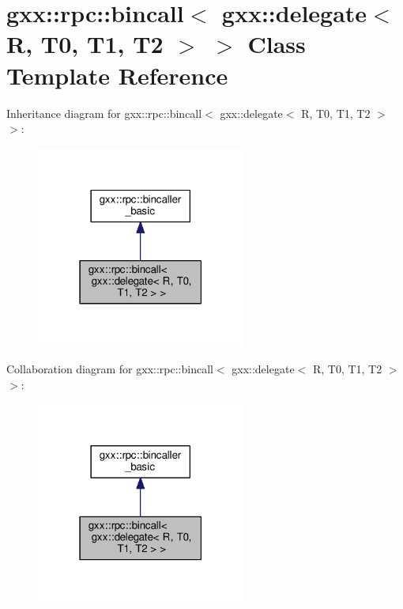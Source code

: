 \hypertarget{classgxx_1_1rpc_1_1bincall_3_01gxx_1_1delegate_3_01R_00_01T0_00_01T1_00_01T2_01_4_01_4}{}\section{gxx\+:\+:rpc\+:\+:bincall$<$ gxx\+:\+:delegate$<$ R, T0, T1, T2 $>$ $>$ Class Template Reference}
\label{classgxx_1_1rpc_1_1bincall_3_01gxx_1_1delegate_3_01R_00_01T0_00_01T1_00_01T2_01_4_01_4}


Inheritance diagram for gxx\+:\+:rpc\+:\+:bincall$<$ gxx\+:\+:delegate$<$ R, T0, T1, T2 $>$ $>$\+:
\nopagebreak
\begin{figure}[H]
\begin{center}
\leavevmode
\includegraphics[width=195pt]{classgxx_1_1rpc_1_1bincall_3_01gxx_1_1delegate_3_01R_00_01T0_00_01T1_00_01T2_01_4_01_4__inherit__graph}
\end{center}
\end{figure}


Collaboration diagram for gxx\+:\+:rpc\+:\+:bincall$<$ gxx\+:\+:delegate$<$ R, T0, T1, T2 $>$ $>$\+:
\nopagebreak
\begin{figure}[H]
\begin{center}
\leavevmode
\includegraphics[width=195pt]{classgxx_1_1rpc_1_1bincall_3_01gxx_1_1delegate_3_01R_00_01T0_00_01T1_00_01T2_01_4_01_4__coll__graph}
\end{center}
\end{figure}
